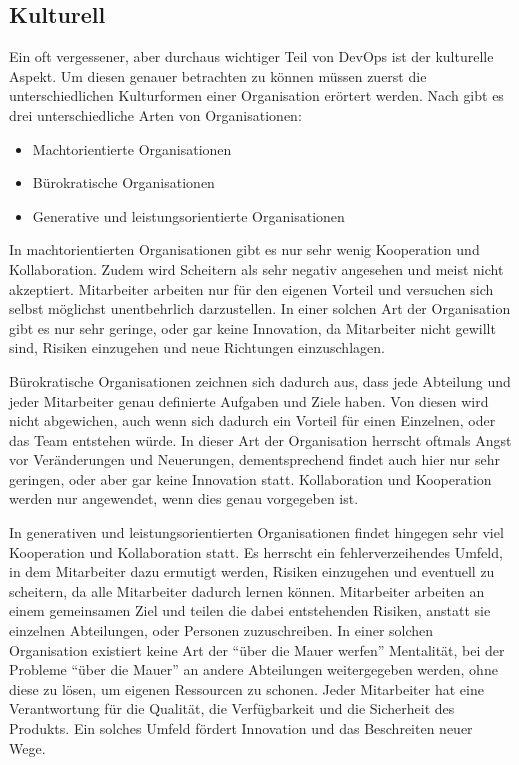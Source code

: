 \subsection{Kulturell}
Ein oft vergessener, aber durchaus wichtiger Teil von DevOps ist der kulturelle Aspekt. 
Um diesen genauer betrachten zu können müssen zuerst die unterschiedlichen Kulturformen einer Organisation erörtert werden.
Nach \parencite[][]{westrum:2004} gibt es drei unterschiedliche Arten von Organisationen:

\begin{itemize}
\item Machtorientierte Organisationen
\item Bürokratische Organisationen
\item Generative und leistungsorientierte Organisationen
\end{itemize}

In machtorientierten Organisationen gibt es nur sehr wenig Kooperation und Kollaboration.
Zudem wird Scheitern als sehr negativ angesehen und meist nicht akzeptiert. Mitarbeiter arbeiten nur für den eigenen Vorteil und versuchen sich selbst möglichst unentbehrlich darzustellen. 
In einer solchen Art der Organisation gibt es nur sehr geringe, oder gar keine Innovation, da Mitarbeiter nicht gewillt sind, Risiken einzugehen und neue Richtungen einzuschlagen.

Bürokratische Organisationen zeichnen sich dadurch aus, dass jede Abteilung und jeder Mitarbeiter genau definierte Aufgaben und Ziele haben. 
Von diesen wird nicht abgewichen, auch wenn sich dadurch ein Vorteil für einen Einzelnen, oder das Team entstehen würde. 
In dieser Art der Organisation herrscht oftmals Angst vor Veränderungen und Neuerungen, dementsprechend findet auch hier nur sehr geringen, oder aber gar keine Innovation statt. Kollaboration und Kooperation werden nur angewendet, wenn dies genau vorgegeben ist.

In generativen und leistungsorientierten Organisationen findet hingegen sehr viel Kooperation und Kollaboration statt. 
Es herrscht ein fehlerverzeihendes Umfeld, in dem Mitarbeiter dazu ermutigt werden, Risiken einzugehen und eventuell zu scheitern, da alle Mitarbeiter dadurch lernen können. 
Mitarbeiter arbeiten an einem gemeinsamen Ziel und teilen die dabei entstehenden Risiken, anstatt sie einzelnen Abteilungen, oder Personen zuzuschreiben. In einer solchen Organisation existiert keine Art der \enquote{über die Mauer werfen} Mentalität, bei der Probleme \enquote{über die Mauer} an andere Abteilungen weitergegeben werden, ohne diese zu lösen, um eigenen Ressourcen zu schonen. 
Jeder Mitarbeiter hat eine Verantwortung für die Qualität, die Verfügbarkeit und die Sicherheit des Produkts. 
Ein solches Umfeld fördert Innovation und das Beschreiten neuer Wege.

